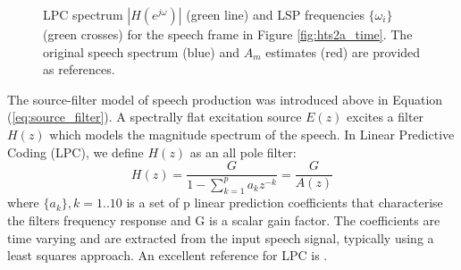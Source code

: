 \documentclass{article}
\begin{document}
{\begin{figure} [h]
\caption{LPC spectrum $|H(e^{j \omega})|$ (green line) and LSP frequencies $\{\omega_i\}$ (green crosses) for the speech frame in Figure \ref{fig:hts2a_time}. The original speech spectrum (blue) and $A_m$ estimates (red) are provided as references.}
\label{fig:hts2a_lpc_lsp}
\begin{center}

\end{center}
\end{figure}

The source-filter model of speech production was introduced above in Equation (\ref{eq:source_filter}).  A spectrally flat excitation source $E(z)$ excites a filter $H(z)$ which models the magnitude spectrum of the speech.  In Linear Predictive Coding (LPC), we define $H(z)$ as an all pole filter:
\begin{equation}
H(z) = \frac{G}{1-\sum_{k=1}^p a_k z^{-k}} = \frac{G}{A(z)}
\end{equation}
where  $\{a_k\}, k=1..10$ is a set of p linear prediction coefficients that characterise the filters frequency response and G is a scalar gain factor.  The coefficients are time varying and are extracted from the input speech signal, typically using a least squares approach.  An excellent reference for LPC is \cite{makhoul1975linear}.

}
\end{document}
